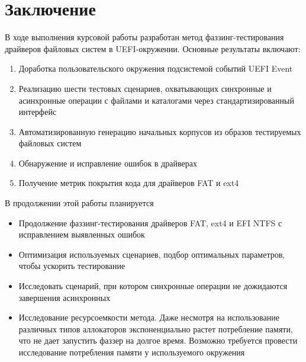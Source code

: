 \section{Заключение}
В ходе выполнения курсовой работы разработан метод фаззинг-тестирования драйверов файловых систем в UEFI-окружении. Основные результаты включают:
\begin{enumerate}
	\item Доработка пользовательского окружения подсистемой событий UEFI Event
	\item Реализацию шести тестовых сценариев, охватывающих синхронные и асинхронные операции с файлами и каталогами через стандартизированный интерфейс 
	\item Автоматизированную генерацию начальных корпусов из образов тестируемых файловых систем
	\item Обнаружение и исправление ошибок в драйверах
	\item Получение метрик покрытия кода для драйверов FAT и ext4
\end{enumerate}

В продолжении этой работы планируется
\begin{itemize}
	\item Продолжение фаззинг-тестирования драйверов FAT, ext4 и EFI NTFS с исправлением выявленных ошибок
	\item Оптимизация используемых сценариев, подбор оптимальных параметров, чтобы ускорить тестирование
	\item Исследовать сценарий, при котором синхронные операции не дожидаются завершения асинхронных
	\item Исследование ресурсоемкости метода. Даже несмотря на использование различных типов аллокаторов экспоненциально растет потребление памяти, что не дает запустить фаззер на долгое время. Возможно требуется провести исследование потребления памяти у используемого окружения
\end{itemize} 